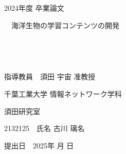 \documentclass[12pt,a4j,titlepage]{ltjsarticle}
\begin{document}
\begin{titlepage}
  \begin{center}
  
    \vspace*{1.5cm}
    
    {\LARGE 2024年度 卒業論文} 
    
    \vspace*{75truept}
    
    {\Huge 　海洋生物の学習コンテンツの開発}　%

    \vspace{10truept}

    {\Huge }　%

    \vspace{10truept}

    {\Huge }　%

    \vspace{85truept}
    
    {\LARGE 指導教員　須田 宇宙 准教授}
    
    \vspace{60truept}
    
    {\LARGE 千葉工業大学 情報ネットワーク学科}
    
    \vspace{15truept}
    
    {\LARGE 須田研究室}
    
    \vspace{70truept}
    
    {\LARGE 2132125　氏名 古川 璃名 }　%

    \vspace{70truept}
    
  \end{center}
  \begin{flushright}

    {\LARGE 提出日　2025年 月 日}
  
  \end{flushright}
\end{titlepage}

\setcounter{tocdepth}{3}
\tableofcontents
\listoftables
\listoffigures
\clearpage
\end{document}
